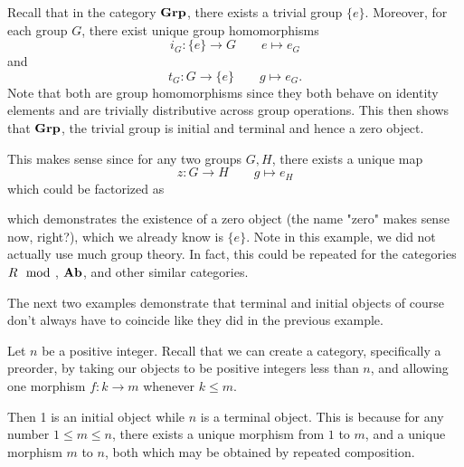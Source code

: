     \begin{example}
        Recall that in the category $\operatorname{\mathbf{Grp}}$, there exists a trivial group 
        $\{e\}$. Moreover, for each group $G$, there exist unique group homomorphisms 
        \[
            i_G: \{e\} \to G \qquad e \mapsto e_G 
        \]
        and 
        \[
            t_G: G \to \{e\} \qquad g \mapsto e_G.
        \]
        Note that both are group homomorphisms since they both behave on identity elements 
        and are trivially distributive across group operations. This then shows that 
        $\operatorname{\mathbf{Grp}}$, the trivial group is initial and terminal and hence a zero object. 

        This makes sense since for any two groups $G, H$, there exists a unique map 
        \[
            z: G \to H \qquad g \mapsto e_H
        \]
        which could be factorized as 
        \begin{center}
        \end{center}
        which demonstrates the existence of a zero object (the name "zero" makes sense now, right?), 
        which we already know is $\{e\}$.
        Note in this example, we did not actually use much group theory. In fact, this could be repeated 
        for the categories $R\mod$, $\operatorname{\mathbf{Ab}}$, and other similar categories. 
    \end{example}

    The next two examples demonstrate that terminal and initial objects of course don't 
    always have to coincide like they did in the previous example. 

    \begin{example}
        Let $n$ be a positive integer. Recall that we can create a category, specifically a 
        preorder, by taking our objects to be positive integers less than $n$, 
        and allowing one morphism $f: k \to m$ whenever $k \le m$.
        \begin{center}
        \end{center}
        Then 1 is an initial object while $n$ is a terminal object. This 
        is because for any number $1 \le m \le n$, there exists a unique morphism 
        from $1$ to $m$, and a unique morphism $m$ to $n$, both which may 
        be obtained by repeated composition. 
    \end{example}


